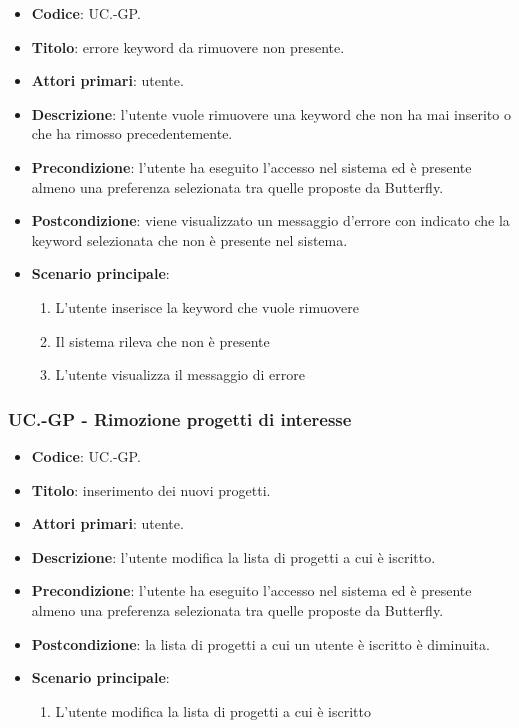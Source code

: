 	\begin{itemize}
		\item \textbf{Codice}: UC\theuccount.\thesubuccount-GP.
		\item \textbf{Titolo}: errore keyword da rimuovere non presente.
		\item \textbf{Attori primari}: utente.
		\item \textbf{Descrizione}: l'utente vuole rimuovere una keyword che non ha mai inserito o che ha rimosso precedentemente.
		\item \textbf{Precondizione}: l’utente ha eseguito l'accesso nel sistema ed è presente almeno
        una preferenza selezionata tra quelle proposte da Butterfly.
		\item \textbf{Postcondizione}: viene visualizzato un messaggio d'errore con indicato che la keyword	selezionata che non è presente nel sistema.
		\item \textbf{Scenario principale}:
		\begin{enumerate}
			\item L'utente inserisce la keyword che vuole rimuovere
			\item Il sistema rileva che non è presente
			\item L'utente visualizza il messaggio di errore
		\end{enumerate}
	\end{itemize}

    \subsubsection{UC\theuccount.\thesubuccount-GP - Rimozione progetti di interesse}
    
    \begin{itemize}
        \item \textbf{Codice}: UC\theuccount.\thesubuccount-GP.
        \item \textbf{Titolo}: inserimento dei nuovi progetti.
        \item \textbf{Attori primari}: utente.
        \item \textbf{Descrizione}: l'utente modifica la lista di progetti a cui è iscritto.
        \item \textbf{Precondizione}: l’utente ha eseguito l'accesso nel sistema ed è presente almeno
        una preferenza selezionata tra quelle proposte da Butterfly.
        \item \textbf{Postcondizione}: la lista di progetti a cui un utente è iscritto è diminuita.
        \item \textbf{Scenario principale}:
        \begin{enumerate}
            \item L'utente modifica la lista di progetti a cui è iscritto
        \end{enumerate}
    \end{itemize}
    
